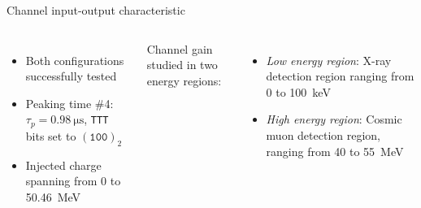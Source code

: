 \documentclass[aspectratio=169,xcolor=dvipsnames,handout]{beamer} %
\newcommand{\greencheck}{{\color{ForestGreen}\checkmark}}
\begin{document}
\begin{frame}{Channel input-output characteristic}
\begin{columns}
            \vskip-0.2cm
            \begin{itemize}
                \item Both configurations successfully tested \greencheck
                \item Peaking time \#4: $\tau_{p} = \SI{0.98}{\micro\second}$, \texttt{TTT} bits set to $(\texttt{100})_{2}$
                \item Injected charge spanning from 0 to \SI{50.46}{\mega\electronvolt}
            \end{itemize}

            \vskip0.3cm
            Channel gain studied in two energy regions:
            \begin{itemize}
                \item \textit{Low energy region}: X-ray detection region ranging from 0 to \SI{100}{\kilo\electronvolt} \greencheck
                \item \textit{High energy region}: Cosmic muon detection region, ranging from 40 to \SI{55}{\mega\electronvolt} \greencheck
            \end{itemize}
            
    \end{columns}
\end{frame}


\end{document}
